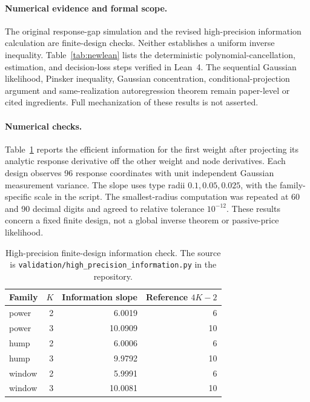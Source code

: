 \documentclass[12pt]{article}
\theoremstyle{definition}
\theoremstyle{remark}
\begin{document}
\paragraph{Numerical evidence and formal scope.} The original response-gap simulation and the revised high-precision information calculation are finite-design checks. Neither establishes a uniform inverse inequality. Table~\ref{tab:newlean} lists the deterministic polynomial-cancellation, estimation, and decision-loss steps verified in Lean~4. The sequential Gaussian likelihood, Pinsker inequality, Gaussian concentration, conditional-projection argument and same-realization autoregression theorem remain paper-level or cited ingredients. Full mechanization of these results is not asserted.

\paragraph{Numerical checks.} Table~\ref{tab:revisionnumerics} reports the efficient information for the first weight after projecting its analytic response derivative off the other weight and node derivatives. Each design observes 96 response coordinates with unit independent Gaussian measurement variance. The slope uses type radii $0.1,0.05,0.025$, with the family-specific scale in the script. The smallest-radius computation was repeated at 60 and 90 decimal digits and agreed to relative tolerance $10^{-12}$. These results concern a fixed finite design, not a global inverse theorem or passive-price likelihood.
\begin{table}[ht]\centering
\begin{tabular}{lrrr}\toprule Family & $K$ & Information slope & Reference $4K-2$\\\midrule
power & 2 & 6.0019 & 6\\
power & 3 & 10.0909 & 10\\
hump & 2 & 6.0006 & 6\\
hump & 3 & 9.9792 & 10\\
window & 2 & 5.9991 & 6\\
window & 3 & 10.0081 & 10\\
\bottomrule\end{tabular}
\caption{High-precision finite-design information check. The source is \nolinkurl{validation/high_precision_information.py} in the repository.}\label{tab:revisionnumerics}\end{table}
\end{document}
